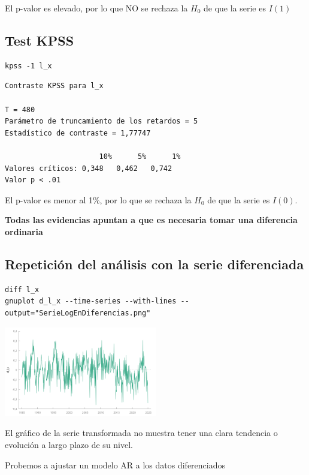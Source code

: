\documentclass[10pt]{article}
\begin{document}
El  p-valor es elevado, por lo que NO se rechaza la \(H_0\) de que la serie es \(I(1)\)
\subsection*{Test KPSS}
\label{sec:orgc580212}

\begin{verbatim}
kpss -1 l_x 
\end{verbatim}

\begin{verbatim}
Contraste KPSS para l_x

T = 480
Parámetro de truncamiento de los retardos = 5
Estadístico de contraste = 1,77747

                      10%      5%      1%
Valores críticos: 0,348   0,462   0,742
Valor p < .01
\end{verbatim}

El  p-valor es menor al 1\%, por lo que se rechaza la \(H_0\) de que la serie es \(I(0)\).

\textbf{Todas las evidencias apuntan a que es necesaria tomar una diferencia ordinaria}
\subsection*{Repetición del análisis con la serie diferenciada}
\label{sec:org6f3fe3f}

\begin{verbatim}
diff l_x
gnuplot d_l_x --time-series --with-lines --output="SerieLogEnDiferencias.png"
\end{verbatim}

\begin{center}
\includegraphics[width=0.5\textwidth]{./EjercicioIdentificacionARIMA/SerieLogEnDiferencias.png}
\end{center}

El gráfico de la serie transformada no muestra tener una clara
tendencia o evolución a largo plazo de su nivel.

Probemos a ajustar un modelo AR a los datos diferenciados
\end{document}
